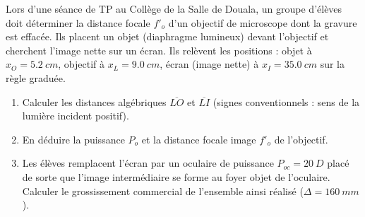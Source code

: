 \documentclass[11pt]{article}
\begin{document}
\begin{exercice}
Lors d'une séance de TP au Collège de la Salle de Douala, un groupe d'élèves doit déterminer la distance focale $f'_o$ d'un objectif de microscope dont la gravure est effacée. Ils placent un objet (diaphragme lumineux) devant l'objectif et cherchent l'image nette sur un écran. Ils relèvent les positions : objet à $x_O = \SI{5,2}{cm}$, objectif à $x_L = \SI{9,0}{cm}$, écran (image nette) à $x_I = \SI{35,0}{cm}$ sur la règle graduée.
\begin{enumerate}
    \item Calculer les distances algébriques $\overline{LO}$ et $\overline{LI}$ (signes conventionnels : sens de la lumière incident positif).
    \item En déduire la puissance $P_o$ et la distance focale image $f'_o$ de l'objectif.
    \item Les élèves remplacent l'écran par un oculaire de puissance $P_{oc} = \SI{20}{D}$ placé de sorte que l'image intermédiaire se forme au foyer objet de l'oculaire. Calculer le grossissement commercial de l'ensemble ainsi réalisé ($\Delta = \SI{160}{mm}$).
\end{enumerate}
\end{exercice}
\end{document}
